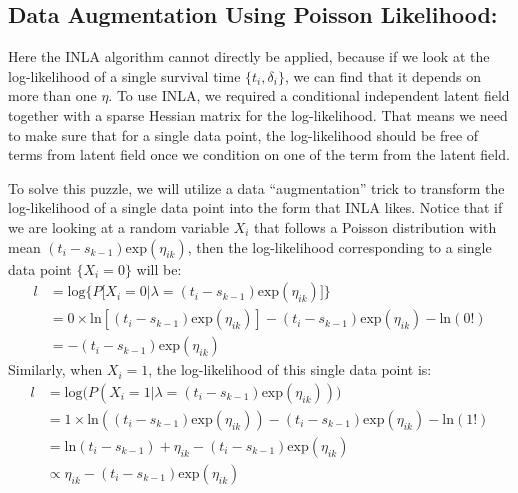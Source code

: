 \documentclass[]{article}
\begin{document}
\hypertarget{data-augmentation-using-poisson-likelihood}{%
\subsection{Data Augmentation Using Poisson
Likelihood:}\label{data-augmentation-using-poisson-likelihood}}

Here the INLA algorithm cannot directly be applied, because if we look
at the log-likelihood of a single survival time \(\{t_i,\delta_i\}\), we
can find that it depends on more than one \(\eta\). To use INLA, we
required a conditional independent latent field together with a sparse
Hessian matrix for the log-likelihood. That means we need to make sure
that for a single data point, the log-likelihood should be free of terms
from latent field once we condition on one of the term from the latent
field.

To solve this puzzle, we will utilize a data ``augmentation'' trick to
transform the log-likelihood of a single data point into the form that
INLA likes. Notice that if we are looking at a random variable \(X_i\)
that follows a Poisson distribution with mean
\((t_i-s_{k-1})\text{exp}(\eta_{ik})\), then the log-likelihood
corresponding to a single data point \(\{X_i = 0 \}\) will be:
\begin{equation}\begin{aligned}\label{eqn:loglike1}
l &= \text{log}\bigg \{P\big [X_i =0|\lambda = (t_i-s_{k-1})\text{exp}(\eta_{ik}) \big]\bigg \}\\
  &= 0\times \text{ln}[(t_i-s_{k-1})\text{exp}(\eta_{ik})] - (t_i-s_{k-1})\text{exp}(\eta_{ik}) - \text{ln}(0!)\\
  &= - (t_i-s_{k-1})\text{exp}(\eta_{ik})
\end{aligned}\end{equation} Similarly, when \(X_i = 1\), the
log-likelihood of this single data point is:
\begin{equation}\begin{aligned}\label{eqn:loglike2}
l &= \text{log}\bigg(P(X_i =1|\lambda = (t_i-s_{k-1})\text{exp}(\eta_{ik}))\bigg)\\
  &= 1\times \text{ln}((t_i-s_{k-1})\text{exp}(\eta_{ik})) - (t_i-s_{k-1})\text{exp}(\eta_{ik}) - \text{ln}(1!)\\
  &= \text{ln}(t_i-s_{k-1})+\eta_{ik}-(t_i-s_{k-1})\text{exp}(\eta_{ik})\\
  &\propto \eta_{ik}-(t_i-s_{k-1})\text{exp}(\eta_{ik})
\end{aligned}\end{equation}
\end{document}
